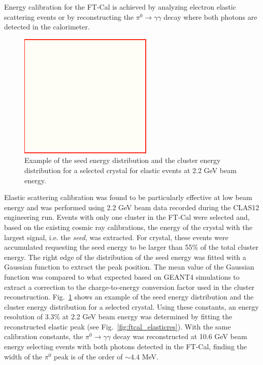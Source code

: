 Energy calibration for the FT-Cal is achieved by analyzing electron elastic scattering events or by reconstructing the $\pi^0\to\gamma\gamma$ decay where both photons are detected in the calorimeter. 

\begin{figure}
\includegraphics[height=1.0\columnwidth]{fig/dummy.png}
\caption{Example of the seed energy distribution and the cluster energy distribution for a selected crystal for elastic events at 2.2 GeV beam energy.}
\label{fig:ftcal_elasticcal}
\end{figure}
Elastic scattering calibration was found to be particularly effective at low beam energy and was performed using 2.2 GeV beam data recorded during the CLAS12 engineering run. Events with only one cluster in the FT-Cal were selected and, based on the existing cosmic ray calibrations, the energy of the crystal with the largest signal, i.e. the {\it seed}, was extracted. For crystal, these events were accumulated requesting the seed energy to be larger than 55\% of the total cluster energy. The right edge of the distribution of the seed energy was fitted with a Gaussian function to extract the peak position. The mean value of the Gaussian function was compared to what expected based on GEANT4 simulations to extract a correction to the charge-to-energy conversion factor used in the cluster reconstruction. Fig.~\ref{fig:ftcal_elasticcal} shows an example of the seed energy distribution and the cluster energy distribution for a selected crystal. Using these constants, an energy resolution of  3.3\% at 2.2 GeV beam energy was determined by fitting the reconstructed elastic peak (see Fig.~\ref{fig:ftcal_elasticres}). With the same calibration constants, the $\pi^0\to\gamma\gamma$ decay was reconstructed at 10.6 GeV beam energy selecting events with both photons detected in the FT-Cal, finding the width of the $\pi^0$ peak is of the order of $\sim 4.4$ MeV.
